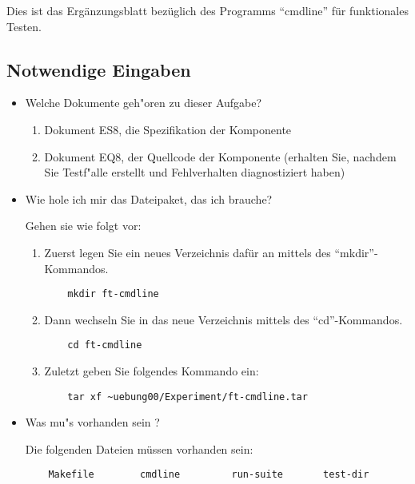 
Dies ist das Erg\"anzungsblatt bez\"uglich des Programms "`cmdline"'
f\"ur funktionales Testen.

\subsection*{Notwendige Eingaben}

\begin{itemize}

\item Welche Dokumente geh"oren zu dieser Aufgabe?

\begin{enumerate}
\item Dokument ES8, die Spezifikation der Komponente
\item Dokument EQ8, der Quellcode der Komponente (erhalten Sie, nachdem Sie
	Testf"alle erstellt und Fehlverhalten diagnostiziert haben)
\end{enumerate}

\item Wie hole ich mir das Dateipaket, das ich brauche?

Gehen sie wie folgt vor:

\begin{enumerate}

\item Zuerst legen Sie ein neues Verzeichnis daf\"ur an mittels des 
"`mkdir"'-Kommandos.
\begin{verbatim}
    mkdir ft-cmdline
\end{verbatim}

\item Dann wechseln Sie in das neue Verzeichnis mittels des 
"`cd"'-Kommandos.
\begin{verbatim}
    cd ft-cmdline
\end{verbatim}

\item Zuletzt geben Sie folgendes Kommando ein:
\begin{verbatim}
    tar xf ~uebung00/Experiment/ft-cmdline.tar
\end{verbatim}

\end{enumerate}

\item Was mu"s vorhanden sein ?

Die folgenden Dateien m\"ussen vorhanden sein:
\begin{verbatim}
    Makefile        cmdline         run-suite       test-dir
\end{verbatim}

\end{itemize}

